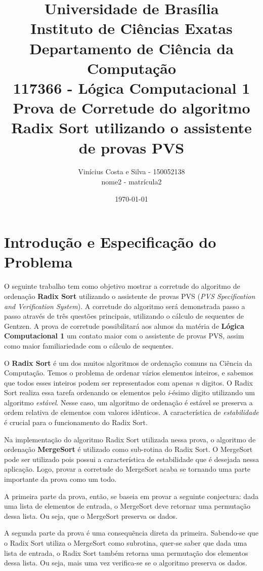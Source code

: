 \documentclass[12pt]{article}
\title{{\large Universidade de Brasília \\ Instituto de Ciências Exatas \\
Departamento de Ciência da Computação} \\[1cm]
117366 - Lógica Computacional 1\\[.5cm]
Prova de Corretude do algoritmo Radix Sort utilizando o assistente de provas PVS}
\author{Vinícius Costa e Silva - 150052138 \\
        nome2 - matrícula2}
\date{\today}
\begin{document}
\maketitle

\section{Introdução e Especificação do Problema}
O seguinte trabalho tem como objetivo mostrar a corretude do algoritmo de ordenação \textbf{Radix Sort} utilizando o assistente de provas PVS (\textit{PVS Specification and Verification System}). A corretude do algoritmo será demonstrada passo a passo através de três questões principais, utilizando o cálculo de sequentes de Gentzen. A prova de corretude possibilitará aos alunos da matéria de \textbf{Lógica Computacional 1} um contato maior com o assistente de provas PVS, assim como maior familiariedade com o cálculo de sequentes.

O \textbf{Radix Sort} é um dos muitos algoritmos de ordenação comuns na Ciência da Computação. Temos o problema de ordenar vários elementos inteiros, e sabemos que todos esses inteiros podem ser representados com apenas \textit{n} digitos. O Radix Sort realiza essa tarefa ordenando os elementos pelo \textit{i}-ésimo digito utilizando um algoritmo \textit{estável}. Nesse caso, um algoritmo de ordenação é estável se preserva a ordem relativa de elementos com valores idênticos. A característica de \textit{estabilidade} é crucial para o funcionamento do Radix Sort.

Na implementação do algoritmo Radix Sort utilizada nessa prova, o algoritmo de ordenação \textbf{MergeSort} é utilizado como sub-rotina do Radix Sort. O MergeSort pode ser utilizado pois possui a característica de estabilidade que é desejada nessa aplicação. Logo, provar a corretude do MergeSort acaba se tornando uma parte importante da prova como um todo.

A primeira parte da prova, então, se baseia em provar a seguinte conjectura: dada uma lista de elementos de entrada, o MergeSort deve retornar uma permutação dessa lista. Ou seja, que o MergeSort preserva os dados.

A segunda parte da prova é uma consequẽncia direta da primeira. Sabendo-se que o Radix Sort utiliza o MergeSort como subrotina, quer-se saber que dada uma lista de entrada, o Radix Sort também retorna uma permutação dos elementos dessa lista. Ou seja, mais uma vez verifica-se se o algoritmo preserva os dados.
\end{document}
